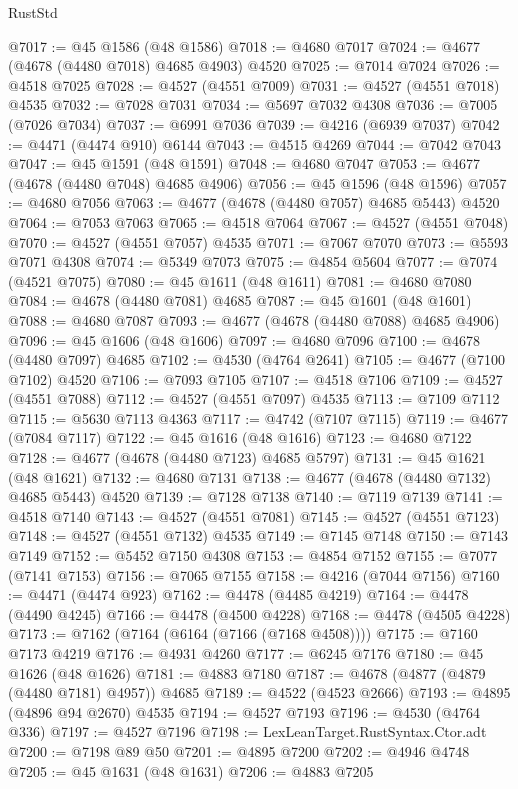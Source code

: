 \begin{lexlean}{RustStd}
\begin{coremodule}
@7017 := @45 @1586 (@48 @1586)
@7018 := @4680 @7017
@7024 := @4677 (@4678 (@4480 @7018) @4685 @4903) @4520
@7025 := @7014 @7024
@7026 := @4518 @7025
@7028 := @4527 (@4551 @7009)
@7031 := @4527 (@4551 @7018) @4535
@7032 := @7028 @7031
@7034 := @5697 @7032 @4308
@7036 := @7005 (@7026 @7034)
@7037 := @6991 @7036
@7039 := @4216 (@6939 @7037)
@7042 := @4471 (@4474 @910) @6144
@7043 := @4515 @4269
@7044 := @7042 @7043
@7047 := @45 @1591 (@48 @1591)
@7048 := @4680 @7047
@7053 := @4677 (@4678 (@4480 @7048) @4685 @4906)
@7056 := @45 @1596 (@48 @1596)
@7057 := @4680 @7056
@7063 := @4677 (@4678 (@4480 @7057) @4685 @5443) @4520
@7064 := @7053 @7063
@7065 := @4518 @7064
@7067 := @4527 (@4551 @7048)
@7070 := @4527 (@4551 @7057) @4535
@7071 := @7067 @7070
@7073 := @5593 @7071 @4308
@7074 := @5349 @7073
@7075 := @4854 @5604
@7077 := @7074 (@4521 @7075)
@7080 := @45 @1611 (@48 @1611)
@7081 := @4680 @7080
@7084 := @4678 (@4480 @7081) @4685
@7087 := @45 @1601 (@48 @1601)
@7088 := @4680 @7087
@7093 := @4677 (@4678 (@4480 @7088) @4685 @4906)
@7096 := @45 @1606 (@48 @1606)
@7097 := @4680 @7096
@7100 := @4678 (@4480 @7097) @4685
@7102 := @4530 (@4764 @2641)
@7105 := @4677 (@7100 @7102) @4520
@7106 := @7093 @7105
@7107 := @4518 @7106
@7109 := @4527 (@4551 @7088)
@7112 := @4527 (@4551 @7097) @4535
@7113 := @7109 @7112
@7115 := @5630 @7113 @4363
@7117 := @4742 (@7107 @7115)
@7119 := @4677 (@7084 @7117)
@7122 := @45 @1616 (@48 @1616)
@7123 := @4680 @7122
@7128 := @4677 (@4678 (@4480 @7123) @4685 @5797)
@7131 := @45 @1621 (@48 @1621)
@7132 := @4680 @7131
@7138 := @4677 (@4678 (@4480 @7132) @4685 @5443) @4520
@7139 := @7128 @7138
@7140 := @7119 @7139
@7141 := @4518 @7140
@7143 := @4527 (@4551 @7081)
@7145 := @4527 (@4551 @7123)
@7148 := @4527 (@4551 @7132) @4535
@7149 := @7145 @7148
@7150 := @7143 @7149
@7152 := @5452 @7150 @4308
@7153 := @4854 @7152
@7155 := @7077 (@7141 @7153)
@7156 := @7065 @7155
@7158 := @4216 (@7044 @7156)
@7160 := @4471 (@4474 @923)
@7162 := @4478 (@4485 @4219)
@7164 := @4478 (@4490 @4245)
@7166 := @4478 (@4500 @4228)
@7168 := @4478 (@4505 @4228)
@7173 := @7162 (@7164 (@6164 (@7166 (@7168 @4508))))
@7175 := @7160 @7173 @4219
@7176 := @4931 @4260
@7177 := @6245 @7176
@7180 := @45 @1626 (@48 @1626)
@7181 := @4883 @7180
@7187 := @4678 (@4877 (@4879 (@4480 @7181) @4957)) @4685
@7189 := @4522 (@4523 @2666)
@7193 := @4895 (@4896 @94 @2670) @4535
@7194 := @4527 @7193
@7196 := @4530 (@4764 @336)
@7197 := @4527 @7196
@7198 := LexLeanTarget.RustSyntax.Ctor.adt
@7200 := @7198 @89 @50
@7201 := @4895 @7200
@7202 := @4946 @4748
@7205 := @45 @1631 (@48 @1631)
@7206 := @4883 @7205

\end{coremodule}
\end{lexlean}
